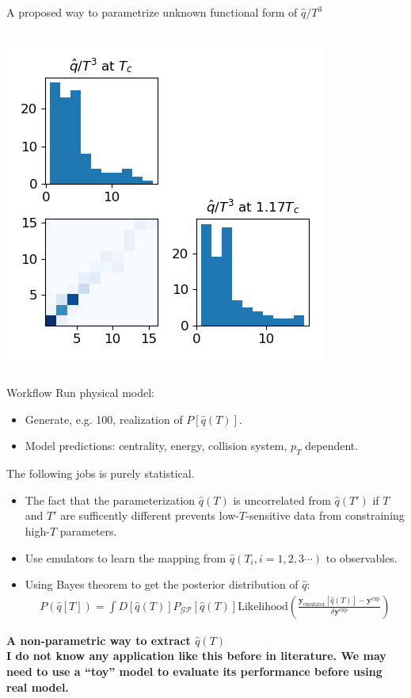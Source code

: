 \documentclass[11pt, aspectratio=1610]{beamer}
\newcommand{\bfy}{\mathbf{y}}
\newcommand{\bfye}{\mathbf{y}^{\textrm{exp}}}
\newcommand{\dbfye}{\delta\mathbf{y}^{\textrm{exp}} }
\newcommand{\like}{ \textrm{Likelihood}}
\begin{document}
\begin{frame}{A proposed way to parametrize unknown functional form of $\hat{q}/T^3$}
\begin{columns}
\begin{column}{.6\textwidth}
\includegraphics[width=.4\textwidth]{qhat_short.png}
\end{column}
\end{columns}
\end{frame}

\begin{frame}{Workflow}
Run physical model:
\begin{itemize}
\item Generate, e.g. 100,  realization of $P[\hat{q}(T)]$.
\item Model predictions: centrality, energy, collision system, $p_T$ dependent.
\end{itemize}
The following jobs is purely statistical.
\begin{itemize}
\item The fact that the parameterization $\hat{q}(T)$ is uncorrelated from $\hat{q}(T')$ if $T$ and $T'$ are sufficently different prevents low-$T$-sensitive data from constraining high-$T$ parameters.
\item Use emulators to learn the mapping from $\hat{q}(T_i, i=1,2,3\cdots)$ to observables.
\item Using Bayes theorem to get the posterior distribution of $\hat{q}$:
\begin{eqnarray}
\nonumber
P(\hat{q}[T]) = \int D[\hat{q}(T)] P_{\mathcal{GP}}[\hat{q}(T)] \like(\frac{\bfy_{\textrm{emulator} }[\hat{q}(T)]-\bfye}{\dbfye})
\end{eqnarray}
\end{itemize}
{\bf A non-parametric way to extract $\hat{q}(T)$}\\
{\bf I do not know any application like this before in literature. We may need to use a ``toy'' model to evaluate its performance before using real model.
}
\end{frame}
\end{document}
